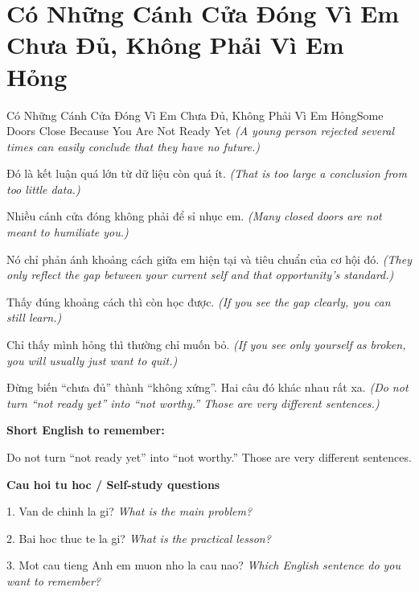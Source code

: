 \section{Có Những Cánh Cửa Đóng Vì Em Chưa Đủ, Không Phải Vì Em Hỏng}
\begin{truyen}{Có Những Cánh Cửa Đóng Vì Em Chưa Đủ, Không Phải Vì Em Hỏng}{Some Doors Close Because You Are Not Ready Yet}
\textit{(A young person rejected several times can easily conclude that they have no future.)}

Đó là kết luận quá lớn từ dữ liệu còn quá ít.
\textit{(That is too large a conclusion from too little data.)}

Nhiều cánh cửa đóng không phải để sỉ nhục em.
\textit{(Many closed doors are not meant to humiliate you.)}

Nó chỉ phản ánh khoảng cách giữa em hiện tại và tiêu chuẩn của cơ hội đó.
\textit{(They only reflect the gap between your current self and that opportunity’s standard.)}

Thấy đúng khoảng cách thì còn học được.
\textit{(If you see the gap clearly, you can still learn.)}

Chỉ thấy mình hỏng thì thường chỉ muốn bỏ.
\textit{(If you see only yourself as broken, you will usually just want to quit.)}

\end{truyen}

\begin{baihoc}
Đừng biến “chưa đủ” thành “không xứng”. Hai câu đó khác nhau rất xa.
\textit{(Do not turn “not ready yet” into “not worthy.” Those are very different sentences.)}
\end{baihoc}

\begin{ghinhoanh}
\textbf{Short English to remember:}

Do not turn “not ready yet” into “not worthy.” Those are very different sentences.

\end{ghinhoanh}

\begin{tuhocnhanh}
\textbf{Cau hoi tu hoc / Self-study questions}

1. Van de chinh la gi? \textit{What is the main problem?}

2. Bai hoc thuc te la gi? \textit{What is the practical lesson?}

3. Mot cau tieng Anh em muon nho la cau nao? \textit{Which English sentence do you want to remember?}
\end{tuhocnhanh}
\ngancach

